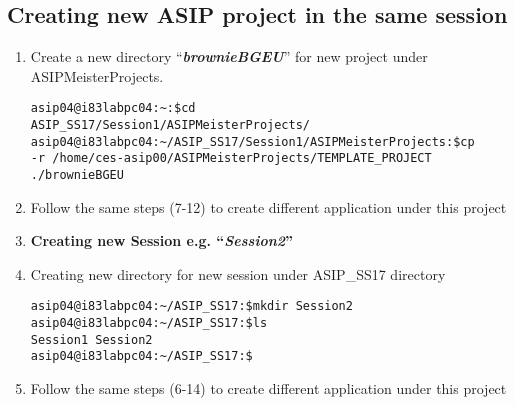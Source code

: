 \subsection{Creating new ASIP project in the same session}
\begin{enumerate}[resume]
	\item Create a new directory ``\emph{\textbf{brownieBGEU}}'' for new project
	under ASIPMeisterProjects.
\begin{lstlisting}
asip04@i83labpc04:~:$cd
ASIP_SS17/Session1/ASIPMeisterProjects/
asip04@i83labpc04:~/ASIP_SS17/Session1/ASIPMeisterProjects:$cp
-r /home/ces-asip00/ASIPMeisterProjects/TEMPLATE_PROJECT ./brownieBGEU
\end{lstlisting}
	\item Follow the same steps (7-12) to create different application under
	this project
	\item \textbf{Creating new Session e.g. ``\emph{Session2}''}
	\item Creating new directory for new session under ASIP\_SS17 directory
\begin{lstlisting}
asip04@i83labpc04:~/ASIP_SS17:$mkdir Session2
asip04@i83labpc04:~/ASIP_SS17:$ls
Session1 Session2
asip04@i83labpc04:~/ASIP_SS17:$
\end{lstlisting}
	\item Follow the same steps (6-14) to create different application under
	this project
\end{enumerate}